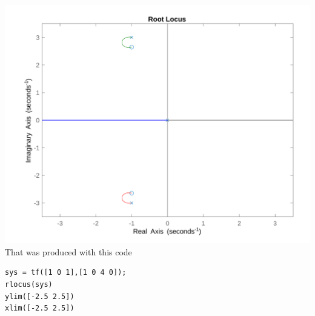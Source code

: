 \documentclass[12pt]{article}
\begin{document}
\includegraphics[scale=.15]{Problem1Matlab1.png}
\\That was produced with this code
\begin{verbatim}
sys = tf([1 0 1],[1 0 4 0]);
rlocus(sys)
ylim([-2.5 2.5])
xlim([-2.5 2.5])
\end{verbatim}
\end{document}
